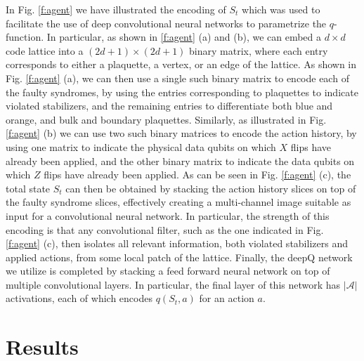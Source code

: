 \documentclass[twocolumn,preprintnumbers,amsmath,amssymb,notitlepage,nofootinbib,longbibliography,superscriptaddress,aps,pra,10pt]{revtex4-1}
\begin{document}
    In Fig. \ref{f:agent} we have illustrated the encoding of $S_t$ which was used to facilitate the use of deep convolutional neural networks to parametrize the $q$-function.
    In particular, as shown in \ref{f:agent} (a) and (b), we can embed a $d\times d$ code lattice into a $(2d + 1)\times(2d+1)$ binary matrix, where each entry corresponds to either a plaquette, a vertex, or an edge of the lattice. 
    As shown in Fig. \ref{f:agent} (a), we can then use a single such binary matrix to encode each of the faulty syndromes, by using the entries corresponding to plaquettes to indicate violated stabilizers, and the remaining entries to differentiate both blue and orange, and bulk and boundary plaquettes. 
    Similarly, as illustrated in  Fig. \ref{f:agent} (b) we can use two such binary matrices to encode the action history, by using one matrix to indicate the physical data qubits on which $X$ flips have already been applied, and the other binary matrix to indicate the data qubits on which $Z$ flips have already been applied.
    As can be seen in Fig. \ref{f:agent} (c), the total state $S_t$ can then be obtained by stacking the action history slices on top of the faulty syndrome slices, effectively creating a multi-channel image suitable as input for a convolutional neural network.
    In particular, the strength of this encoding is that any convolutional filter, such as the one indicated in Fig. \ref{f:agent} (c), then isolates all relevant information, both violated stabilizers and applied actions, from some local patch of the lattice.
    Finally, the deepQ network we utilize is completed by stacking a feed forward neural network on top of multiple convolutional layers. In particular, the final layer of this network has $|\mathcal{A}|$ activations, each of which encodes $q(S_t,a)$ for an action $a$.


\section{Results}\label{s:results}
\end{document}
